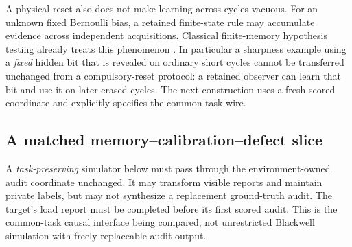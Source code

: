 A physical reset also does not make learning across cycles vacuous. For an unknown fixed Bernoulli bias, a retained finite-state rule may accumulate evidence across independent acquisitions. Classical finite-memory hypothesis testing already treats this phenomenon \cite{HellmanCover}. In particular a sharpness example using a \emph{fixed} hidden bit that is revealed on ordinary short cycles cannot be transferred unchanged from a compulsory-reset protocol: a retained observer can learn that bit and use it on later erased cycles. The next construction uses a fresh scored coordinate and explicitly specifies the common task wire.

\subsection{A matched memory--calibration--defect slice}
A \emph{task-preserving} simulator below must pass through the environment-owned audit coordinate unchanged. It may transform visible reports and maintain private labels, but may not synthesize a replacement ground-truth audit. The target's load report must be completed before its first scored audit. This is the common-task causal interface being compared, not unrestricted Blackwell simulation with freely replaceable audit output.

